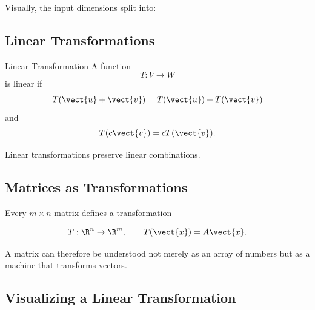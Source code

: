 Visually, the input dimensions split into:

\begin{center}
\end{center}

\subsection{Linear Transformations}
\label{subsec:linear-transformations}

\begin{definitionbox}{Linear Transformation}
A function
\[ T:V\to W \]
is linear if
\[ T(\vect{u}+\vect{v})=T(\vect{u})+T(\vect{v}) \]
and
\[ T(c\vect{v})=cT(\vect{v}). \]
\end{definitionbox}

Linear transformations preserve linear combinations.

\subsection{Matrices as Transformations}
\label{subsec:matrices-transformations}

Every \(m\times n\) matrix defines a transformation

\[ T:\R^n\to\R^m,\qquad T(\vect{x})=A\vect{x}. \]

A matrix can therefore be understood not merely as an array of numbers but as
a machine that transforms vectors.

\subsection{Visualizing a Linear Transformation}
\label{subsec:visual-linear-transformation}

